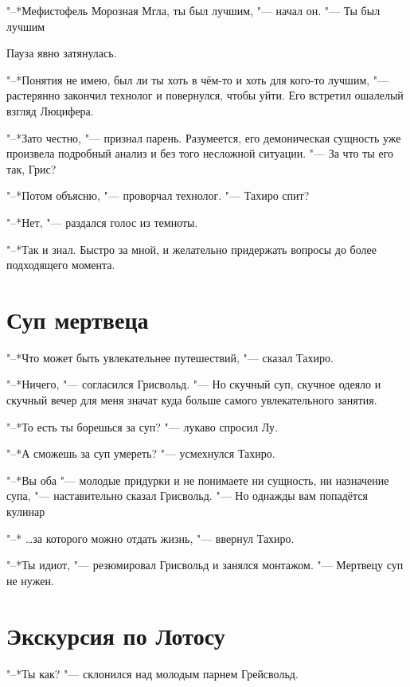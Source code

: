 \documentclass[a4paper,10pt]{book}
\newcommand{\mulang}[3]{#2}%
\newcommand{\ldotst}{\so{...}\xspace}
\begin{document}
"--*Мефистофель Морозная Мгла, ты был лучшим, "--- начал он. "--- Ты был 
лучшим\ldotst

Пауза явно затянулась.

\mulang{}{"--*Понятия не имею, был ли ты хоть в чём-то и хоть для кого-то лучшим, "--- растерянно закончил технолог и повернулся, чтобы уйти.}
{``I've no idea if you were good at something or for somebody,'' confused Griswold finished, then turned around to leave.}
Его встретил ошалелый взгляд Люцифера.

\mulang{}{"--*Зато честно, "--- признал парень.}
{``You're honest, anyway,'' Lu declared.}
Разумеется, его демоническая сущность уже произвела подробный анализ и без того несложной ситуации.
"--- За что ты его так, Грис?

"--*Потом объясню, "--- проворчал технолог. "--- Тахиро спит?

"--*Нет, "--- раздался голос из темноты.

"--*Так и знал. Быстро за мной, и желательно придержать вопросы до более 
подходящего момента.

\section{Суп мертвеца}

"--*Что может быть увлекательнее путешествий, "--- сказал Тахиро.

"--*Ничего, "--- согласился Грисвольд. "--- Но скучный суп, скучное одеяло и 
скучный вечер для меня значат куда больше самого увлекательного занятия.

"--*То есть ты борешься за суп? "--- лукаво спросил Лу.

"--*А сможешь за суп умереть? "--- усмехнулся Тахиро.

"--*Вы оба "--- молодые придурки и не понимаете ни сущность, ни назначение 
супа, "--- наставительно сказал Грисвольд. "--- Но однажды вам попадётся 
кулинар\ldotst

"--* \dots за которого можно отдать жизнь, "--- ввернул Тахиро.

"--*Ты идиот, "--- резюмировал Грисвольд и занялся монтажом. "--- Мертвецу суп 
не нужен.

\section{Экскурсия по Лотосу}

"--*Ты как? "--- склонился над молодым парнем Грейсвольд.
\end{document}
